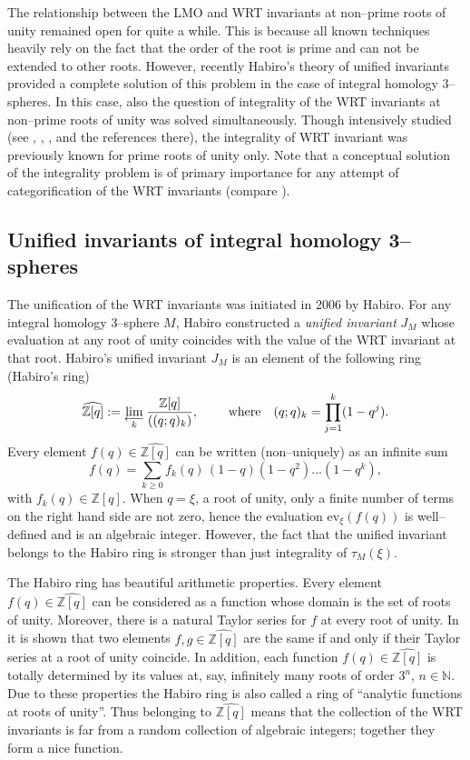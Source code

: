 \documentclass[12pt]{amsart}
\theoremstyle{plain}
\theoremstyle{definition}
\def\BZ{\mathbb Z}
\def\N{{\mathbb N}}
\def\Z{\BZ}
\def\ev{\mathrm{ev}}
\def\Habiro{\widehat{\Z[q]}}
\begin{document}
The  relationship between the LMO and WRT invariants
at non--prime roots of unity remained open
for quite a while.
This is because all known techniques heavily
rely on the fact that the order of the root is prime and can not
be extended to other roots.  However, recently
 Habiro's theory \cite{Ha} of unified
invariants  provided
a complete solution of this problem in the case
of integral homology 3--spheres. In this case, also
the  question of  integrality of the WRT invariants at non--prime roots of unity
was solved simultaneously. Though
intensively studied (see
\cite{Mu}, \cite{MR}, \cite{GM}, \cite{Le10} and the references there),
 the integrality of WRT invariant was previously known
  for prime roots of unity only.
Note that a conceptual solution of the integrality problem is of primary
importance for any attempt of  categorification of the
WRT invariants (compare \cite{Kho}).





\subsection*{Unified invariants of integral homology 3--spheres}
The unification of the WRT invariants was initiated  in 2006 by Habiro.
For any  integral homology
3--sphere $M$,
Habiro \cite{Ha} constructed a {\em unified invariant} $J_M$
 whose evaluation  at any root of unity coincides with
the value of the  WRT
invariant at that root.
Habiro's unified invariant $J_M$ is an element of the following
ring (Habiro's ring)
\[
\Habiro:=\lim_{\overleftarrow{\hspace{2mm}k\hspace{2mm}}}
\frac{\Z[q]}{
((q;q)_k)},  \qquad \text{ where} \quad (q;q)_k = \prod_{j=1}^k (1-q^j).
\]
Every element $f(q)\in \Habiro$ can be written (non--uniquely) as an infinite sum
\[
f(q)= \sum_{k\ge 0} f_k(q)\, (1-q)(1-q^2)...(1-q^k),
\]
with $f_k(q)\in \Z[q]$. When $q=\xi$, a root of unity,
 only a finite number of terms on the right hand side are not zero,
hence  the evaluation
$\ev_\xi(f(q))$ is well--defined and is an algebraic integer.
However,  the fact that the unified invariant belongs to the Habiro ring
is stronger than just integrality of $\tau_M(\xi)$.





The Habiro ring has beautiful
arithmetic properties.
Every element $f(q) \in \Habiro$ can be considered
 as a function whose domain is the set
 of roots of unity.
Moreover, there is a natural Taylor series for $f$ at every root
of unity.
In \cite{Ha} it is shown that two elements $f,g \in \Habiro$ are the same if and
only if their Taylor series at a root of unity coincide.
In addition, each function $f(q) \in \Habiro$ is totally determined
by its values at, say,
infinitely many  roots of order $3^n,\, n\in \N$.
Due to these properties the Habiro ring is also called
a ring of ``analytic functions at roots of unity''. Thus belonging to $\Habiro$ means that the
collection of the  WRT invariants is far from a random
collection of algebraic integers; together they form a nice function.
\end{document}
